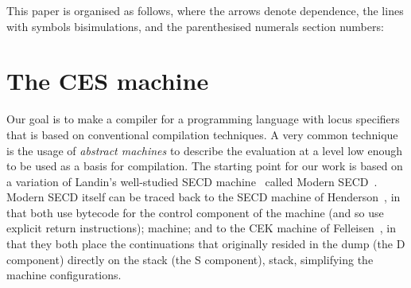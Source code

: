 \documentclass{article}
\theoremstyle{definition}
\newcommand{\DCESHi}{DCESH}
\newcommand{\DCESHn}{DCESH}
\begin{document}
This paper is organised as
follows, where the arrows denote dependence, the lines with
 symbols bisimulations, and the parenthesised numerals section numbers:
\begin{center}
\end{center}


\section{The CES machine} \label{section:CES}
Our goal is to make a compiler for a programming language with
locus specifiers that is based on conventional compilation techniques.
A very common technique is the usage of \emph{abstract machines} to describe
the evaluation at a level low enough to be used as a basis for compilation.
The starting point for our work is based on a variation of Landin's
well-studied SECD machine~\cite{Landin64} called Modern SECD~\cite{ModernSECD}.
Modern SECD itself can be traced back to the SECD machine of
Henderson~\cite{DBLP:books/daglib/0068837}, in that both use bytecode for the
control component of the 
\iffullversion
machine
(and so use explicit return instructions);
\else
machine;
\fi
and
to the CEK machine of Felleisen~\cite{Felleisen:1986:CEK}, in that they both
place the continuations that originally resided in the dump
\iffullversion
(the D component)
\fi
directly on the
\iffullversion
stack (the S component),
\else
stack,
\fi
simplifying the machine configurations.
\end{document}
